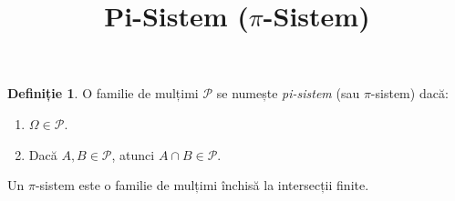 \documentclass[12pt]{article}
\title{Pi-Sistem ($\pi$-Sistem)}
\author{}
\date{}
\theoremstyle{definition}
\newtheorem{definition}{Definiție}
\begin{document}
\maketitle

\begin{definition}
O familie de mulțimi $\mathcal{P}$ se numește \emph{pi-sistem} (sau $\pi$-sistem) dacă:
\begin{enumerate}
    \item $\Omega \in \mathcal{P}$.
    \item Dacă $A, B \in \mathcal{P}$, atunci $A \cap B \in \mathcal{P}$.
\end{enumerate}
\end{definition}

\noindent
Un $\pi$-sistem este o familie de mulțimi închisă la intersecții finite.
\end{document}
